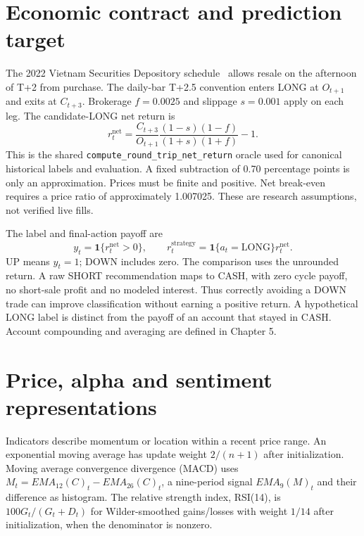 \section{Economic contract and prediction target}\label{s:e2142a9a841370b4}
The 2022 Vietnam Securities Depository schedule~\cite{vsd2022settlement}
allows resale on the afternoon of T+2 from purchase. The daily-bar
T+2.5 convention enters LONG at $O_{t+1}$ and exits at $C_{t+3}$.
Brokerage $f=0.0025$ and slippage $s=0.001$ apply on each leg. The
candidate-LONG net return is
\begin{equation}\label{eq:net}
r_t^{\mathrm{net}}=\frac{C_{t+3}}{O_{t+1}}
\frac{(1-s)(1-f)}{(1+s)(1+f)}-1.
\end{equation}
This is the shared \texttt{compute\_round\_trip\_net\_return} oracle used
for canonical historical labels and evaluation. A fixed subtraction of
0.70 percentage points is only an approximation. Prices must be finite
and positive. Net break-even requires a price ratio of approximately
1.007025. These are research assumptions, not verified live fills.

The label and final-action payoff are
\begin{equation}\label{eq:label}
y_t=\mathbf1\{r_t^{\mathrm{net}}>0\},\qquad
r_t^{\mathrm{strategy}}=\mathbf1\{a_t=\mathrm{LONG}\}r_t^{\mathrm{net}}.
\end{equation}
UP means $y_t=1$; DOWN includes zero. The comparison uses the unrounded
return. A raw SHORT recommendation maps to CASH, with zero cycle payoff,
no short-sale profit and no modeled interest. Thus correctly avoiding a
DOWN trade can improve classification without earning a positive return.
A hypothetical LONG label is distinct from the payoff of an account that
stayed in CASH. Account compounding and averaging are defined in Chapter 5.

\section{Price, alpha and sentiment representations}\label{s:3d7214e9b7762ca0}
Indicators describe momentum or location within a recent price range.
An exponential moving average has update weight $2/(n+1)$ after
initialization. Moving average convergence divergence (MACD) uses $M_t=EMA_{12}(C)_t-EMA_{26}(C)_t$, a nine-period
signal $EMA_9(M)_t$ and their difference as histogram. The relative strength index, RSI(14), is
$100G_t/(G_t+D_t)$ for Wilder-smoothed gains/losses with weight $1/14$
after initialization, when the denominator is nonzero.

